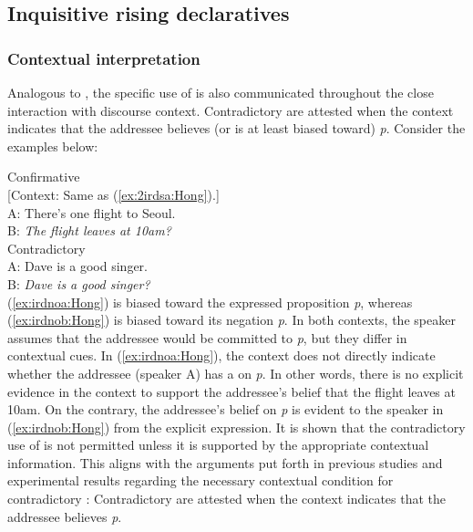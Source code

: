\documentclass[output=paper,colorlinks,citecolor=brown]{langscibook}
\begin{document}
\subsection{Inquisitive rising declaratives}
\label{sec:ird:Hong}

\subsubsection{Contextual interpretation}
\label{sec:irdcont:Hong}

Analogous to , the specific use of  is also communicated throughout the close interaction with discourse context. Contradictory  are attested when the context indicates that the addressee believes (or is at least biased toward) \textit{p}. Consider the examples below:

\ea \label{ex:irdno:Hong}
    \ea \label{ex:irdnoa:Hong} Confirmative \\
    {[Context: Same as (\ref{ex:2irdsa:Hong}).]}\\
    A: There's one flight to Seoul.\\
    B: \textit{The flight leaves at 10am?}\\
    \ex \label{ex:irdnob:Hong} Contradictory \\
    A: Dave is a good singer.\\
    B: \textit{Dave is a good singer?}\\
    \z
\z
(\ref{ex:irdnoa:Hong}) is biased toward the expressed proposition \textit{p}, whereas (\ref{ex:irdnob:Hong}) is biased toward its negation \textit{\neg p}. In both contexts, the speaker assumes that the addressee would be committed to \textit{p}, but they differ in contextual cues. In (\ref{ex:irdnoa:Hong}), the context does not directly indicate whether the addressee (speaker A) has a  on \textit{p}. In other words, there is no explicit evidence in the context to support the addressee’s belief that the flight leaves at 10am. On the contrary, the addressee’s belief on \textit{p} is evident to the speaker in (\ref{ex:irdnob:Hong}) from the explicit expression. It is shown that the contradictory use of  is not permitted unless it is supported by the appropriate contextual information. This aligns with the arguments put forth in previous studies \citep{gunlogson2003true, farkas2017division} and experimental results \citep{jeong2018intonation} regarding the necessary contextual condition for contradictory : Contradictory  are attested when the context indicates that the addressee believes \textit{p}.
\end{document}
